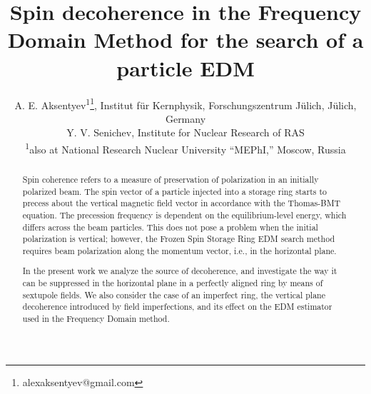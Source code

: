 \documentclass[a4paper]{jacow}
\begin{document}
\title{Spin decoherence in the Frequency Domain Method for the search of a particle EDM}
\author{A. E. Aksentyev\textsuperscript{1}\thanks{alexaksentyev@gmail.com},
  Institut f\"ur Kernphysik, Forschungszentrum J\"ulich, J\"ulich, Germany \\
  Y. V. Senichev, Institute for Nuclear Research of RAS \\
  \textsuperscript{1}also at National Research Nuclear University ``MEPhI,'' Moscow, Russia}

\maketitle
\begin{abstract}
  Spin coherence refers to a measure of preservation of polarization in an initially polarized beam. The spin vector of a particle injected into a storage ring starts to precess about the vertical magnetic field vector in accordance with the Thomas-BMT equation. The precession frequency is dependent on the equilibrium-level energy, which differs across the beam particles. This does not pose a problem when the initial polarization is vertical; however, the Frozen Spin Storage Ring EDM search method requires beam polarization along the momentum vector, i.e., in the horizontal plane. 
  
  In the present work we analyze the source of decoherence, and investigate the way it can be suppressed in the horizontal plane in a perfectly aligned ring by means of sextupole fields. We also consider the case of an imperfect ring, the vertical plane decoherence introduced by field imperfections, and its effect on the EDM estimator used in the Frequency Domain method.
\end{abstract}
\end{document}
